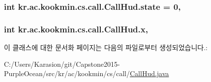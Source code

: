 \subsubsection[{state}]{\setlength{\rightskip}{0pt plus 5cm}int kr.\+ac.\+kookmin.\+cs.\+call.\+Call\+Hud.\+state = 0\hspace{0.3cm}{\ttfamily [static]}, {\ttfamily [private]}}\label{classkr_1_1ac_1_1kookmin_1_1cs_1_1call_1_1_call_hud_a205351e41055a51d9b1d33ee0c6d84f1}
\hypertarget{classkr_1_1ac_1_1kookmin_1_1cs_1_1call_1_1_call_hud_a5fb59820575dd36c90906279886188f4}{}
\subsubsection[{x}]{\setlength{\rightskip}{0pt plus 5cm}int kr.\+ac.\+kookmin.\+cs.\+call.\+Call\+Hud.\+x\hspace{0.3cm}{\ttfamily [static]}, {\ttfamily [private]}}\label{classkr_1_1ac_1_1kookmin_1_1cs_1_1call_1_1_call_hud_a5fb59820575dd36c90906279886188f4}


이 클래스에 대한 문서화 페이지는 다음의 파일로부터 생성되었습니다.\+:\begin{DoxyCompactItemize}
\item 
C\+:/\+Users/\+Karasion/git/\+Capstone2015-\/\+Purple\+Ocean/src/kr/ac/kookmin/cs/call/\hyperlink{_call_hud_8java}{Call\+Hud.\+java}\end{DoxyCompactItemize}
